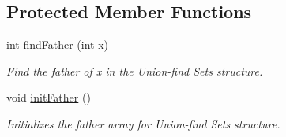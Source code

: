 \subsection*{Protected Member Functions}
\begin{DoxyCompactItemize}
\item 
int \hyperlink{classcmst_1_1_graph2_d_a0b860daa24f288eea5f490e12fcb67e2}{find\+Father} (int x)
\begin{DoxyCompactList}\small\item\em Find the father of x in the Union-\/find Sets structure. \end{DoxyCompactList}\item 
void \hyperlink{classcmst_1_1_graph2_d_a5de76dfe02b4a13e0d3fe9a5e7ea7285}{init\+Father} ()
\begin{DoxyCompactList}\small\item\em Initializes the father array for Union-\/find Sets structure. \end{DoxyCompactList}\end{DoxyCompactItemize}
